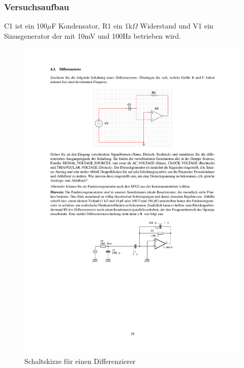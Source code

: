 \documentclass[12pt,a4paper]{article}
\begin{document}
\subsubsection{Versuchsaufbau}

C1 ist ein 100$\mu$F Kondensator, R1 ein 1k$\Omega$ Widerstand und V1 ein Sinusgenerator der mit 10mV und 100Hz betrieben wird.

\begin{figure}[H] 
  \centering
    \includegraphics[trim = 10mm 200mm 10mm 40mm, clip, scale = 1]{ep5_14[Page19].pdf}
  	\caption[Schaltskizze für einen Differenzierer]{Schaltskizze für einen Differenzierer\footnotemark}
  \label{fig:4_a_3}
\end{figure}
\end{document}
